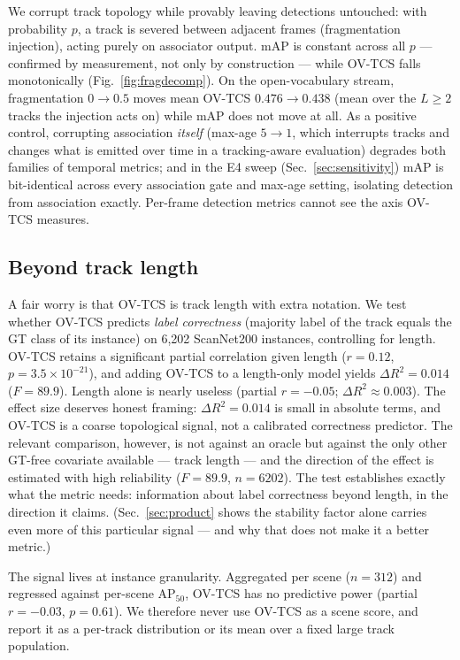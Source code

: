\documentclass[10pt,twocolumn,letterpaper]{article}
\begin{document}
We corrupt track topology while provably leaving detections untouched:
with probability $p$, a track is severed between adjacent frames
(fragmentation injection), acting purely on associator output. mAP is
constant across all $p$ --- confirmed by measurement, not only by
construction --- while OV-TCS falls monotonically
(Fig.~\ref{fig:fragdecomp}). On the open-vocabulary stream, fragmentation
$0\!\to\!0.5$ moves mean OV-TCS $0.476\!\to\!0.438$ (mean over the $L\ge2$
tracks the injection acts on) while mAP does not move at all. As a positive control, corrupting association
\emph{itself} (max-age $5\!\to\!1$, which interrupts tracks and changes what
is emitted over time in a tracking-aware evaluation) degrades both families
of temporal metrics; and in the E4 sweep (Sec.~\ref{sec:sensitivity}) mAP is
bit-identical across every association gate and max-age setting, isolating
detection from association exactly. Per-frame detection metrics cannot see
the axis OV-TCS measures.

\subsection{Beyond track length}
\label{sec:beyond_length}

A fair worry is that OV-TCS is track length with extra notation. We test
whether OV-TCS predicts \emph{label correctness} (majority label of the track
equals the GT class of its instance) on 6{,}202 ScanNet200 instances,
controlling for length. OV-TCS retains a significant partial correlation
given length ($r{=}0.12$, $p{=}3.5{\times}10^{-21}$), and adding OV-TCS to a
length-only model yields $\Delta R^2{=}0.014$ ($F{=}89.9$). Length alone is
nearly useless (partial $r{=}-0.05$; $\Delta R^2{\approx}0.003$). The effect
size deserves honest framing: $\Delta R^2{=}0.014$ is small in absolute
terms, and OV-TCS is a coarse topological signal, not a calibrated
correctness predictor. The relevant comparison, however, is not against an
oracle but against the only other GT-free covariate available --- track
length --- and the direction of the effect is estimated with high
reliability ($F{=}89.9$, $n{=}6202$). The test establishes exactly what the
metric needs: information about label correctness beyond length, in the
direction it claims. (Sec.~\ref{sec:product} shows the stability factor
alone carries even more of this particular signal --- and why that does not
make it a better metric.)

The signal lives at instance granularity. Aggregated per scene ($n{=}312$)
and regressed against per-scene AP$_{50}$, OV-TCS has no predictive power
(partial $r{=}-0.03$, $p{=}0.61$). We therefore never use OV-TCS as a scene
score, and report it as a per-track distribution or its mean over a fixed
large track population.
\end{document}
